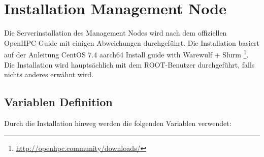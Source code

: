
\section{Installation Management Node}
Die Serverinstallation des Management Nodes wird nach dem offiziellen OpenHPC Guide mit einigen Abweichungen durchgeführt. Die Installation basiert auf der Anleitung CentOS 7.4 aarch64 Install guide with Warewulf + Slurm \footnote{\url{http://openhpc.community/downloads/}}. Die Installation wird hauptsächlich mit dem ROOT-Benutzer durchgeführt, falls nichts anderes erwähnt wird.

\subsection{Variablen Definition}
Durch die Installation hinweg werden die folgenden Variablen verwendet:

